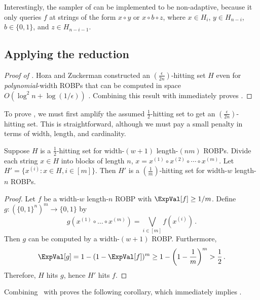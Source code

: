 Interestingly, the sampler of  can be implemented to be non-adaptive, because it only queries $f$ at strings of the form $x \circ y$ or $x \circ b \circ z$, where $x \in H_i$, $y \in H_{n - i}$, $b \in \{0, 1\}$, and $z \in H_{n - i - 1}$.

\subsection{Applying the reduction}

\begin{proof}[Proof of ]
Hoza and Zuckerman constructed an $\left(\frac{\epsilon}{2n}\right)$-hitting set $H$ even for \emph{polynomial}-width ROBPs that can be computed in space $O(\log^2 n + \log(1/\epsilon))$ \cite{HZ20}. Combining this result with  immediately proves .
\end{proof}

To prove , we must first amplify the assumed $\frac{1}{2}$-hitting set to get an $\left(\frac{\epsilon}{2n}\right)$-hitting set. This is straightforward, although we must pay a small penalty in terms of width, length, and cardinality.
\begin{lemma} \label{lem:hitting-set-amplification}
Suppose $H$ is a $\frac{1}{2}$-hitting set for width-$(w + 1)$ length-$(nm)$ ROBPs. Divide each string $x \in H$ into blocks of length $n$, $x = x^{(1)} \circ x^{(2)} \circ \cdots \circ x^{(m)}$. Let $H' = \{x^{(i)} : x \in H, i \in [m]\}$. Then $H'$ is a $(\frac{1}{m})$-hitting set for width-$w$ length-$n$ ROBPs.
\end{lemma}

\begin{proof}
Let $f$ be a width-$w$ length-$n$ ROBP with $\ExpVal[f] \geq 1/m$. Define $g \colon (\{0, 1\}^n)^m \to \{0, 1\}$ by
$$
g(x^{(1)} \circ \dots \circ x^{(m)}) = \bigvee_{i \in [m]} f(x^{(i)})\,.
$$
Then $g$ can be computed by a width-$(w + 1)$ ROBP. Furthermore,
$$
\ExpVal[g] = 1 - (1 - \ExpVal[f])^m \geq 1 - \left(1 - \frac{1}{m}\right)^m > \frac{1}{2}\,.
$$
Therefore, $H$ hits $g$, hence $H'$ hits $f$.
\end{proof}

Combining~ with  proves the following corollary, which immediately implies .

